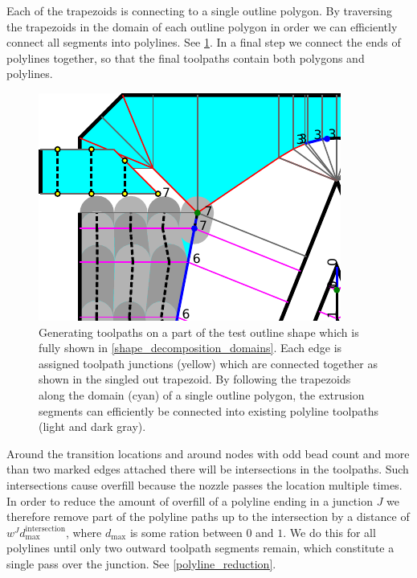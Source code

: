 Each of the trapezoids is connecting to a single outline polygon.
By traversing the trapezoids in the domain of each outline polygon in order we can efficiently connect all segments into polylines.
See \cref{segment_generation}.
In a final step we connect the ends of polylines together, so that the final toolpaths contain both polygons and polylines.

\begin{figure}
\centering
\includegraphics[width=.5\columnwidth]{sources/method/segment_generation.pdf}
\caption{
Generating toolpaths on a part of the test outline shape which is fully shown in \cref{shape_decomposition_domains}.
Each edge is assigned toolpath junctions (yellow) which are connected together as shown in the singled out trapezoid.
By following the trapezoids along the domain (cyan) of a single outline polygon,
the extrusion segments can efficiently be connected into existing polyline toolpaths (light and dark gray).
}
\label{segment_generation}
\end{figure}


Around the transition locations and around nodes with odd bead count and more than two marked edges attached there will be intersections in the toolpaths.
Such intersections cause overfill because the nozzle passes the location multiple times.
In order to reduce the amount of overfill of a polyline ending in a junction $J$ we therefore remove part of the polyline paths up to the intersection by a distance of $w^J d_\text{max}^\text{intersection}$, where $d_\text{max}$ is some ration between $0$ and $1$.
We do this for all polylines until only two outward toolpath segments remain, which constitute a single pass over the junction.
See \cref{polyline_reduction}.


